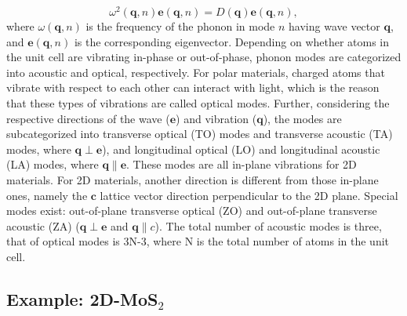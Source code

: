 \begin{equation}\label{eqa:w_q}
\omega^2(\mathbf{q},n)\mathbf{e}(\mathbf{q},n)=D(\mathbf{q})\mathbf{e}(\mathbf{q},n),
\end{equation}
where $\omega(\mathbf{q},n)$ is the frequency of the phonon in mode $n$ having wave vector $\mathbf{q}$, and $\mathbf{e}(\mathbf{q},n)$ is the corresponding eigenvector\cite{Ackland1997,Parlinski2011}.  Depending on whether atoms in the unit cell are vibrating in-phase or out-of-phase, phonon modes are categorized into acoustic and optical, respectively. For polar materials, charged atoms that vibrate with respect to each other can interact with light, which is the reason that these types of vibrations are called optical modes. Further, considering the respective directions of the wave ($\mathbf{e}$) and vibration ($\mathbf{q}$), the modes are subcategorized into transverse optical (TO) modes and transverse acoustic (TA) modes, where $\mathbf{q} \perp \mathbf{e}$), and longitudinal optical (LO) and longitudinal acoustic (LA) modes, where $\mathbf{q} \parallel \mathbf{e}$. These modes are all in-plane vibrations for 2D materials. For 2D materials, another direction is different from those in-plane ones, namely the $\mathbf{c}$ lattice vector direction perpendicular to the 2D plane. Special modes exist: out-of-plane transverse optical (ZO) and out-of-plane transverse acoustic (ZA) ($\mathbf{q} \perp \mathbf{e}$ and $\mathbf{q} \parallel c$). The total number of acoustic modes is three, that of optical modes is 3N-3, where N is the total number of atoms in the unit cell. 


\subsection{Example: 2D-MoS$_2$}

